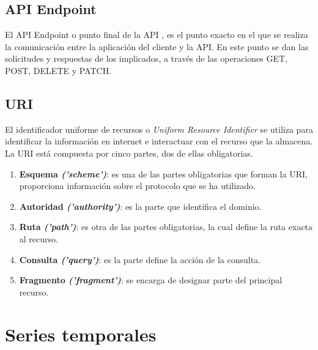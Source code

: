 \subsection{API Endpoint}
El API Endpoint o punto final de la API \cite{apiEndpoint}, es el punto exacto en el que se realiza la comunicación entre la aplicación del cliente y la API. En este punto se dan las solicitudes y respuestas de los implicados, a través de las operaciones GET, POST, DELETE y PATCH.

\subsection{URI}
El identificador uniforme de recursos o \textit{Uniform Resource Identifier} \cite{URI} se utiliza para identificar la información en internet e interactuar con el recurso que la almacena.
La URI está compuesta por cinco partes, dos de ellas obligatorias.
\begin{enumerate}
    \item \textbf{Esquema \textit{('scheme')}}: es una de las partes obligatorias que forman la URI, proporciona información sobre el protocolo que se ha utilizado.
    \item \textbf{Autoridad \textit{('authority')}}: es la parte que identifica el dominio.
    \item \textbf{Ruta \textit{('path')}}: es otra de las partes obligatorias, la cual define la ruta exacta al recurso.
    \item \textbf{Consulta \textit{('query')}}: es la parte define la acción de la consulta.
    \item \textbf{Fragmento \textit{('fragment')}}: se encarga de designar parte del principal recurso.
\end{enumerate}

\section{Series temporales}

